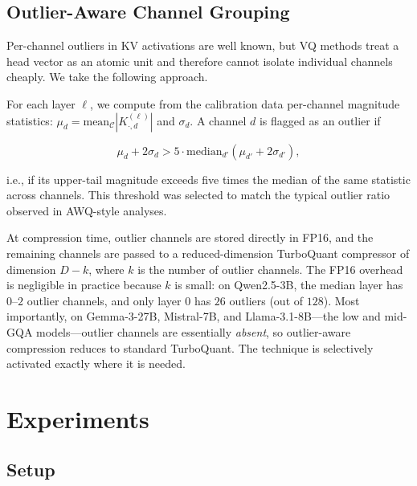 \documentclass[11pt]{article}
\begin{document}
\subsection{Outlier-Aware Channel Grouping}
\label{sec:outlier}

Per-channel outliers in KV activations are well known, but VQ methods treat a head vector as an atomic unit and therefore cannot isolate individual channels cheaply. We take the following approach.

For each layer $\ell$, we compute from the calibration data per-channel magnitude statistics: $\mu_d = \mathrm{mean}_\mathcal{C} |K^{(\ell)}_{\cdot, d}|$ and $\sigma_d$. A channel $d$ is flagged as an outlier if

\begin{equation}
\mu_d + 2 \sigma_d > 5 \cdot \mathrm{median}_{d'}(\mu_{d'} + 2 \sigma_{d'}),
\end{equation}

i.e., if its upper-tail magnitude exceeds five times the median of the same statistic across channels. This threshold was selected to match the typical outlier ratio observed in AWQ-style analyses.

At compression time, outlier channels are stored directly in FP16, and the remaining channels are passed to a reduced-dimension TurboQuant compressor of dimension $D - k$, where $k$ is the number of outlier channels. The FP16 overhead is negligible in practice because $k$ is small: on Qwen2.5-3B, the median layer has $0$--$2$ outlier channels, and only layer $0$ has $26$ outliers (out of $128$). Most importantly, on Gemma-3-27B, Mistral-7B, and Llama-3.1-8B---the low and mid-GQA models---outlier channels are essentially \emph{absent}, so outlier-aware compression reduces to standard TurboQuant. The technique is selectively activated exactly where it is needed.



\section{Experiments}
\label{sec:experiments}

\subsection{Setup}
\end{document}
